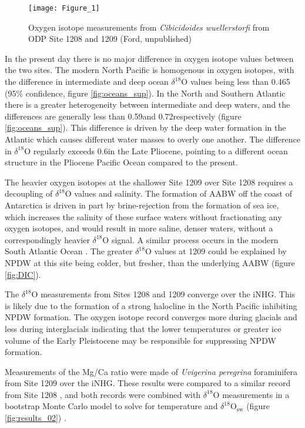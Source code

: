 \begin{figure}[h]
    \centering
    \texttt{[image: Figure\_1]}
    \caption{Oxygen isotope measurements from \emph{Cibicidoides wuellerstorfi} from ODP Site 1208 \citep{ventiPaleoproductivityNorthwesternPacific2017} and 1209 (Ford, unpublished)}
    \label{fig:results_01}
\end{figure}

In the present day there is no major difference in oxygen isotope values between the two sites. The modern North Pacific is homogenous in oxygen isotopes, with the difference in intermediate and deep ocean $\delta^{18}\text{O}$ values being less than 0.465 \textperthousand (95\% confidence, figure \ref{fig:oceans_sup}). In the North and Southern Atlantic there is a greater heterogeneity between intermediate and deep waters, and the differences are generally less than 0.59\textperthousand and 0.72\textperthousand respectively (figure \ref{fig:oceans_sup}). This difference is driven by the deep water formation in the Atlantic which causes different water masses to overly one another. The difference in $\delta^{18}\text{O}$ regularly exceeds 0.6\textperthousand in the Late Pliocene, pointing to a different ocean structure in the Pliocene Pacific Ocean compared to the present.

The heavier oxygen isotopes at the shallower Site 1209 over Site 1208 requires a decoupling of $\delta^{18}$O values and salinity. The formation of AABW off the coast of Antarctica is driven in part by brine-rejection from the formation of sea ice, which increases the salinity of these surface waters without fractionating any oxygen isotopes, and would result in more saline, denser waters, without a correspondingly heavier $\delta^{18}\text{O}$ signal. A similar process occurs in the modern South Atlantic Ocean \citep{lynch-stieglitzMeridionalOverturningCirculation2006}. The greater $\delta^{18}$O values at 1209 could be explained by NPDW at this site being colder, but fresher, than the underlying AABW (figure \ref{fig:DIC}).

The $\delta^{18}\text{O}$ measurements from Sites 1208 and 1209 converge over the iNHG. This is likely due to the formation of a strong halocline in the North Pacific inhibiting NPDW formation. The oxygen isotope record converges more during glacials and less during interglacials indicating that the lower temperatures or greater ice volume of the Early Pleistocene may be responsible for suppressing NPDW formation.

Measurements of the Mg/Ca ratio were made of \emph{Uvigerina peregrina} foraminifera from Site 1209 over the iNHG. These results were compared to a similar record from Site 1208 \citep{woodardAntarcticRoleNorthern2014}, and both records were combined with $\delta^{18}\text{O}$ measurements in a bootstrap Monte Carlo model to solve for temperature and $\delta^{18}\text{O}_\text{sw}$ (figure \ref{fig:results_02}) \citep{thirumalaiConstrainingSeawater182016}. 

